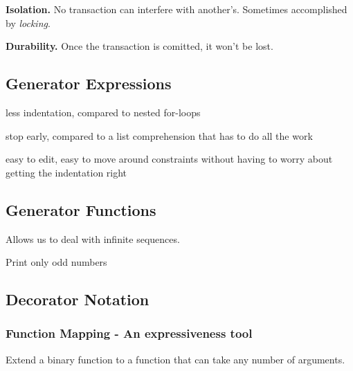 \documentclass[12pt]{article}
\begin{document}
\textbf{Isolation.} No transaction can interfere with another's. Sometimes accomplished by \emph{locking}.

\textbf{Durability.} Once the transaction is comitted, it won't be lost.



\subsection{Generator Expressions}

\begin{list}{*}{
\setlength{\itemsep}{0pt}
\setlength{\parsep}{0pt}
\setlength{\topsep}{0pt}
\setlength{\partopsep}{0pt}
\setlength{\leftmargin}{2em}
\setlength{\labelwidth}{1.5em}
\setlength{\labelsep}{0.5em}
}
\item less indentation, compared to nested for-loops
\item stop early, compared to a list comprehension that has to do all the work
\item easy to edit, easy to move around constraints without having to worry about getting the indentation right
\end{list}






\subsection{Generator Functions}

Allows us to deal with infinite sequences.



Print only odd numbers





\subsection{Decorator Notation}

\subsubsection{Function Mapping - An expressiveness tool}

Extend a binary function to a function that can take any number of arguments.
\end{document}
